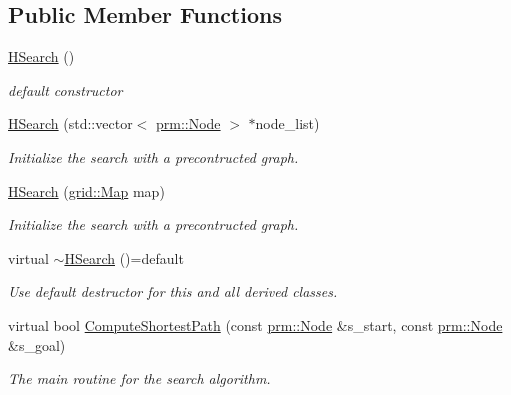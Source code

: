 \subsection*{Public Member Functions}
\begin{DoxyCompactItemize}
\item 
\mbox{\label{classhsearch_1_1HSearch_a88c750ab9e6c9ad303f468ef270619c3}} 
\hyperlink{classhsearch_1_1HSearch_a88c750ab9e6c9ad303f468ef270619c3}{H\+Search} ()
\begin{DoxyCompactList}\small\item\em default constructor \end{DoxyCompactList}\item 
\hyperlink{classhsearch_1_1HSearch_a52aed9d8d8c634bd506cfd3c14620884}{H\+Search} (std\+::vector$<$ \hyperlink{structprm_1_1Node}{prm\+::\+Node} $>$ $\ast$node\+\_\+list)
\begin{DoxyCompactList}\small\item\em Initialize the search with a precontructed graph. \end{DoxyCompactList}\item 
\hyperlink{classhsearch_1_1HSearch_a58bce8362211fa679ebf8200dc31d03d}{H\+Search} (\hyperlink{structgrid_1_1Map}{grid\+::\+Map} map)
\begin{DoxyCompactList}\small\item\em Initialize the search with a precontructed graph. \end{DoxyCompactList}\item 
\mbox{\label{classhsearch_1_1HSearch_ab48be1a6bdbd923ce5e83f6b39323941}} 
virtual \hyperlink{classhsearch_1_1HSearch_ab48be1a6bdbd923ce5e83f6b39323941}{$\sim$\+H\+Search} ()=default
\begin{DoxyCompactList}\small\item\em Use default destructor for this and all derived classes. \end{DoxyCompactList}\item 
virtual bool \hyperlink{classhsearch_1_1HSearch_a8641b99479bbdf017bf5a1168b763c27}{Compute\+Shortest\+Path} (const \hyperlink{structprm_1_1Node}{prm\+::\+Node} \&s\+\_\+start, const \hyperlink{structprm_1_1Node}{prm\+::\+Node} \&s\+\_\+goal)
\begin{DoxyCompactList}\small\item\em The main routine for the search algorithm. \end{DoxyCompactList}\item 

\end{DoxyCompactItemize}

